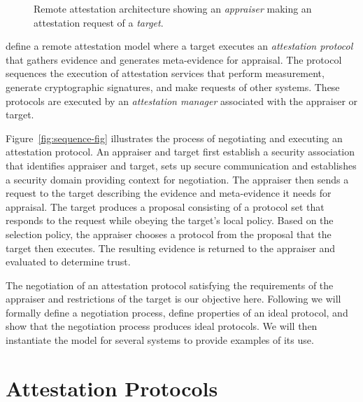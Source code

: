 \documentclass[sigconf,authordraft]{acmart}
\begin{document}
\begin{figure}[hbtp]
  \centering 
  \caption[Attestation architecture]{Remote attestation architecture
    showing an \emph{appraiser} making an attestation request of a
    \emph{target}.}
  \label{fig:architecture-fig}
\end{figure}

\citet{Coker::Principles-of-R,Coker:08:Attestation:-Ev} define a
remote attestation model where a target executes an \emph{attestation
  protocol} that gathers evidence and generates meta-evidence for
appraisal.  The protocol sequences the execution of attestation
services that perform measurement, generate cryptographic signatures,
and make requests of other systems. These protocols are executed by an
\emph{attestation manager} associated with the appraiser or target.


Figure~\ref{fig:sequence-fig} illustrates the process of negotiating
and executing an attestation protocol.  An appraiser and target first
establish a security association that identifies appraiser and target,
sets up secure communication and establishes a security domain
providing context for negotiation.  The appraiser then sends a request
to the target describing the evidence and meta-evidence it needs for
appraisal.  The target produces a proposal consisting of a protocol
set that responds to the request while obeying the target's local
policy. Based on the selection policy, the appraiser chooses a
protocol from the proposal that the target then executes.  The
resulting evidence is returned to the appraiser and evaluated to
determine trust.


The negotiation of an attestation protocol satisfying the requirements
of the appraiser and restrictions of the target is our objective here.
Following we will formally define a negotiation process, define
properties of an ideal protocol, and show that the negotiation process
produces ideal protocols.  We will then instantiate the model for
several systems to provide examples of its use.

\section{Attestation Protocols}
\end{document}
